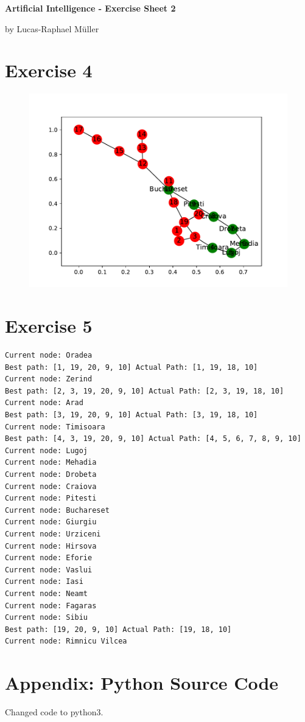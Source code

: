 \documentclass[11pt,a4paper,twoside]{article}
\begin{document}
\renewcommand\thesubsection{\alph{subsection})}

\lstset {
language = bash,
	breaklines = true,
	breakatwhitespace = true
}

\centerline{\LARGE \textbf{Artificial Intelligence - Exercise Sheet 2}}\vspace{0.5em}
\centerline{\large by Lucas-Raphael Müller}\vspace{2em}

\section*{Exercise 4}

\begin{figure}[btp]
	\centering
	\includegraphics[width=.8\textwidth]{figures/graph}
	\label{gauss1}
\end{figure}

\section*{Exercise 5}
\begin{lstlisting}
Current node: Oradea
Best path: [1, 19, 20, 9, 10] Actual Path: [1, 19, 18, 10]
Current node: Zerind
Best path: [2, 3, 19, 20, 9, 10] Actual Path: [2, 3, 19, 18, 10]
Current node: Arad
Best path: [3, 19, 20, 9, 10] Actual Path: [3, 19, 18, 10]
Current node: Timisoara
Best path: [4, 3, 19, 20, 9, 10] Actual Path: [4, 5, 6, 7, 8, 9, 10]
Current node: Lugoj
Current node: Mehadia
Current node: Drobeta
Current node: Craiova
Current node: Pitesti
Current node: Buchareset
Current node: Giurgiu
Current node: Urziceni
Current node: Hirsova
Current node: Eforie
Current node: Vaslui
Current node: Iasi
Current node: Neamt
Current node: Fagaras
Current node: Sibiu
Best path: [19, 20, 9, 10] Actual Path: [19, 18, 10]
Current node: Rimnicu Vilcea
\end{lstlisting}

\newpage
\section{Appendix: Python Source Code}
Changed code to python3.

\end{document}
